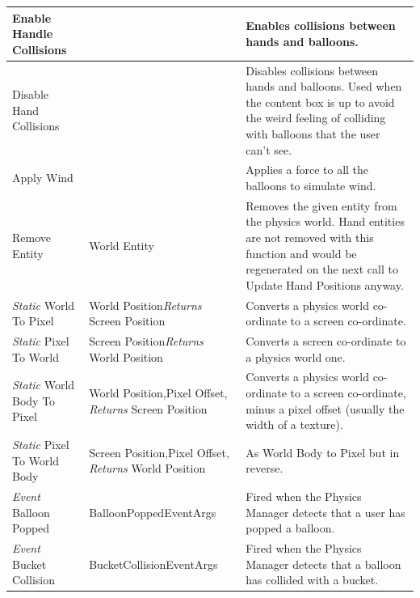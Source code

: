 \begin{longtable}{|p{4.5cm}|p{3.5cm}|p{7.7cm}|}
Enable Handle Collisions & &
Enables collisions between hands and balloons. \\ \hline

Disable Hand Collisions & &
Disables collisions between hands and balloons. Used when the content box is 
up to avoid the weird feeling of colliding with balloons that the user can't 
see. \\ \hline

Apply Wind & & 
Applies a force to all the balloons to simulate wind. \\ \hline

Remove Entity & World Entity &
Removes the given entity from the physics world. Hand entities are not removed
with this function and would be regenerated on the next call to Update Hand 
Positions anyway. \\ \hline

\emph{Static} World To Pixel & World Position\newline \emph{Returns} Screen Position &
Converts a physics world co-ordinate to a screen co-ordinate.\\ \hline

\emph{Static} Pixel To World & Screen Position\newline \emph{Returns} World Position &
Converts a screen co-ordinate to a physics world one.\\ \hline

\emph{Static} World Body To Pixel & World Position,\newline Pixel Offset,\newline 
\emph{Returns} Screen Position &
Converts a physics world co-ordinate to a screen co-ordinate, minus a pixel 
offset (usually the width of a texture).\\ \hline

\emph{Static} Pixel To World Body & Screen Position,\newline Pixel Offset,\newline
\emph{Returns} World Position & 
As World Body to Pixel but in reverse.\\ \hline

\emph{Event} Balloon Popped & BalloonPopped\-EventArgs &
Fired when the Physics Manager detects that a user has popped a balloon.
\\ \hline

\emph{Event} Bucket Collision & BucketCollision\-EventArgs & 
Fired when the Physics Manager detects that a balloon has collided with a 
bucket.\\ \hline

\end{longtable}

